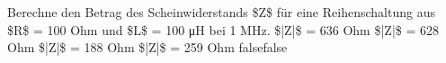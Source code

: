     {Berechne den Betrag des Scheinwiderstands \$Z\$ für eine Reihenschaltung aus \$R\$ = 100 Ohm und \$L\$ = 100 μH bei 1 MHz.}
    {\$|Z|\$ = 636 Ohm}
    {\$|Z|\$ = 628 Ohm}
    {\$|Z|\$ = 188 Ohm}
    {\$|Z|\$ = 259 Ohm}
    {false}{false}